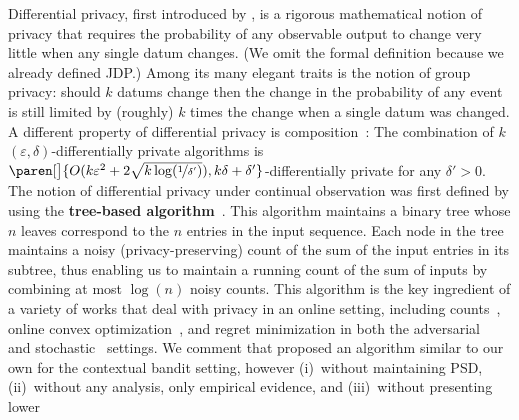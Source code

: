 \documentclass{article}
\DeclarePairedDelimiter{\paren}()
\renewcommand{\paragraph}[1]{\vspace{2pt}\noindent\textbf{#1}}
\begin{document}
Differential privacy, first introduced by
\citet{DworkCalibratingNoiseSensitivity2006,DworkOurData2006}, is a
rigorous mathematical notion of privacy that requires the probability
of any observable output to change very little when any single datum
changes.  (We omit the formal definition because we already defined JDP.)
Among its many elegant traits is the notion of group privacy: should
$k$ datums change then the change in the probability of any event is
still limited by (roughly) $k$ times the change when a single datum
was changed.  A different property of differential privacy is composition~\cite{DworkBoosting2010}: The combination of $k$ $(\varepsilon,\delta)$-differentially private algorithms is $\paren[\big]{O(k\varepsilon^2 + 2\sqrt{k\log(\nicefrac 1 {\delta'})}), k\delta+\delta'}$-differentially private for any $\delta'>0$.
%
The notion of differential privacy under continual observation was
first defined by \citet{DworkContinualObservation2010} using the \textbf{tree-based algorithm}~\citep[originally
appearing in][]{ChanPrivateContinualRelease2010}. This algorithm
maintains a binary tree whose $n$ leaves correspond to the $n$ entries
in the input sequence. Each node in the tree maintains a noisy
(privacy-preserving) count of the sum of the input entries in its
subtree, thus enabling us to maintain a running count of the sum of
inputs by combining at most $\log(n)$ noisy counts. This
algorithm is the key ingredient of a variety of works that deal with
privacy in an online setting, including
counts~\cite{DworkContinualObservation2010}, online convex
optimization~\cite{JainDPOnlineLearning2012}, and regret minimization
in both the
adversarial~\citep{SmithThakurtaPrivateOnlineLearning2013,TossouAchievingPrivacyAdversarial2017}
and
stochastic~\cite{MishraNearlyOptimalDPBandits2015,TossouAlgDPBandits2016}
settings. We comment that \citet{MishraNearlyOptimalDPBandits2015}
proposed an algorithm similar to our own for the contextual bandit
setting, however (i)~without maintaining PSD, (ii)~without any
analysis, only empirical evidence, and (iii)~without presenting lower
\end{document}
